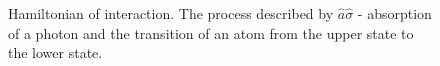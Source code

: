 \begin{figure}
\centering



\caption{Hamiltonian of interaction. The process described by $\hat{a}\hat{\sigma}$ - absorption
  of a photon and the transition of an atom from the upper state to the lower state.}
\label{figPart1Ch2_2_1}
\end{figure}